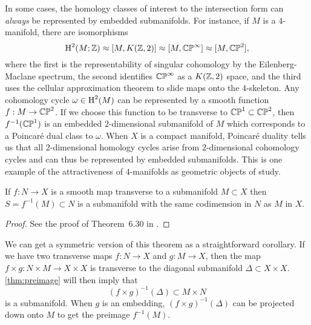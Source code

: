 \begin{remark}
	In some cases, the homology classes of interest to the intersection form can \emph{always} be represented by embedded submanifolds. For instance, if $M$ is a $4$-manifold, there are isomorphisms
	\begin{equation}
		\operatorname{H}^2(M; \mathbb{Z}) \approx [M, K(\mathbb{Z},2)] \approx [M, \mathbb{CP}^\infty] \approx [M,\mathbb{CP}^2],
	\end{equation}
	where the first is the representability of singular cohomology by the Eilenberg-Maclane spectrum, the second identifies $\mathbb{CP}^\infty$ as a $K(\mathbb{Z},2)$ space, and the third uses the cellular approximation theorem to slide maps onto the $4$-skeleton. Any cohomology cycle $\omega\in \operatorname{H}^2(M)$ can be represented by a smooth function $f : M \to \mathbb{CP}^2$. If we choose this function to be transverse to $\mathbb{CP}^1\subset \mathbb{CP}^2$, then $f^{-1}(\mathbb{CP}^1)$ is an embedded $2$-dimensional submanifold of $M$ which corresponds to a Poincar\'e dual class to $\omega$. When $X$ is a compact manifold, Poincar\'e duality tells us that all $2$-dimensional homology cycles arise from $2$-dimensional cohomology cycles and can thus be represented by embedded submanifolds. This is one example of the attractiveness of $4$-manifolds as geometric objects of study.
\end{remark}


\begin{theorem}\label{thm:preimage}
	If $f : N \to X$ is a smooth map transverse to a submanifold $M\subset X$ then $S=f^{-1}(M)\subset N$ is a submanifold with the same codimension in $N$ as $M$ in $X$.
\end{theorem}
\begin{proof}
	See the proof of Theorem~6.30 in \cite{lee2013smooth}.
\end{proof}

\begin{remark}\label{rmk:symmetric-preimage-theorem}
	We can get a symmetric version of this theorem as a straightforward corollary. If we have two transverse maps $f : N\to X$ and $g : M\to X$, then the map $f\times g : N\times M \to X\times X$ is transverse to the diagonal submanifold $\Delta\subset X\times X$. \cref{thm:preimage} will then imply that
	\[
		(f\times g)^{-1}(\Delta) \subset M\times N
	\]
	is a submanifold. When $g$ is an embedding, $(f\times g)^{-1}(\Delta)$ can be projected down onto $M$ to get the preimage $f^{-1}(M)$.
\end{remark}

